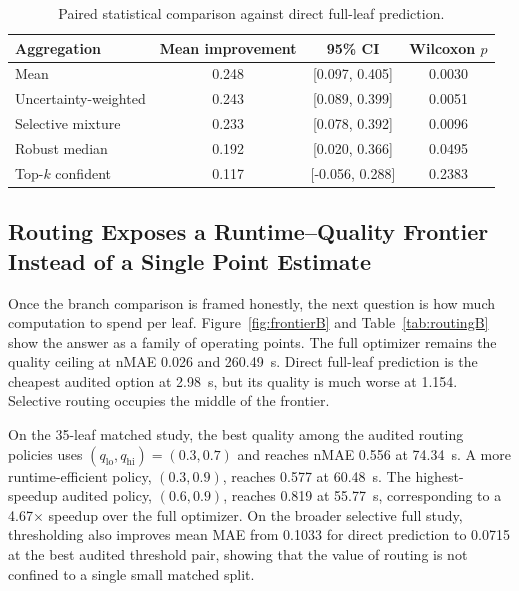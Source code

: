 \documentclass[11pt,a4paper]{article}
\newcommand{\nmae}{nMAE}
\begin{document}
\begin{table}[H]
\centering
\caption{Paired statistical comparison against direct full-leaf prediction.}
\label{tab:statsB}
\small
\begin{tabular}{lccc}
\toprule
Aggregation & Mean improvement & 95\% CI & Wilcoxon $p$ \\
\midrule
Mean & 0.248 & [0.097, 0.405] & 0.0030 \\
Uncertainty-weighted & 0.243 & [0.089, 0.399] & 0.0051 \\
Selective mixture & 0.233 & [0.078, 0.392] & 0.0096 \\
Robust median & 0.192 & [0.020, 0.366] & 0.0495 \\
Top-$k$ confident & 0.117 & [-0.056, 0.288] & 0.2383 \\
\bottomrule
\end{tabular}
\end{table}

\subsection{Routing Exposes a Runtime--Quality Frontier Instead of a Single Point Estimate}
Once the branch comparison is framed honestly, the next question is how much computation to spend per leaf.
Figure~\ref{fig:frontierB} and Table~\ref{tab:routingB} show the answer as a family of operating points.
The full optimizer remains the quality ceiling at \nmae{} 0.026 and 260.49~s.
Direct full-leaf prediction is the cheapest audited option at 2.98~s, but its quality is much worse at 1.154.
Selective routing occupies the middle of the frontier.

On the 35-leaf matched study, the best quality among the audited routing policies uses $(q_{\mathrm{lo}},q_{\mathrm{hi}})=(0.3,0.7)$ and reaches \nmae{} 0.556 at 74.34~s.
A more runtime-efficient policy, $(0.3,0.9)$, reaches 0.577 at 60.48~s.
The highest-speedup audited policy, $(0.6,0.9)$, reaches 0.819 at 55.77~s, corresponding to a 4.67$\times$ speedup over the full optimizer.
On the broader selective full study, thresholding also improves mean MAE from 0.1033 for direct prediction to 0.0715 at the best audited threshold pair, showing that the value of routing is not confined to a single small matched split.
\end{document}
